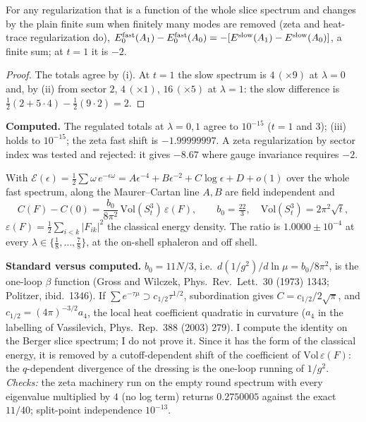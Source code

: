\begin{corollary}\label{p4cor:minus2}
 For any regularization that is a function of the whole slice spectrum and changes by the plain finite sum when finitely many modes are removed (zeta and heat-trace regularization do),
$E_0^{\rm fast}(A_1)-E_0^{\rm fast}(A_0)=-[E^{\rm slow}(A_1)-E^{\rm slow}(A_0)]$, a finite sum; at $t=1$ it is $-2$.
\end{corollary}
\begin{proof}
The totals agree by (i). At $t=1$ the slow spectrum is $4\,(\times9)$ at $\lambda=0$ and, by (ii) from sector $2$,
$4\,(\times1)$, $16\,(\times5)$ at $\lambda=1$: the slow difference is $\tfrac12(2+5\cdot4)-\tfrac12(9\cdot2)=2$.
\end{proof}
\noindent\textbf{Computed.} The regulated totals at $\lambda=0,1$ agree to $10^{-15}$ ($t=1$ and $3$); (iii) holds to
$10^{-15}$; the zeta fast shift is $-1.99999997$. A zeta regularization
by sector index was tested and rejected: it gives $-8.67$ where gauge invariance requires $-2$.

\begin{theorem}\label{p4thm:uv}
 With $\mathcal{E}(\epsilon)=\tfrac12\sum\omega\,e^{-\epsilon\omega}=A\epsilon^{-4}+B\epsilon^{-2}+C\log\epsilon+D+o(1)$
over the whole fast spectrum, along the Maurer--Cartan line $A,B$ are field independent and
\[
 C(F)-C(0)=\frac{b_0}{8\pi^2}\,\mathrm{Vol}(S^3_t)\,\varepsilon(F),\qquad b_0=\tfrac{22}{3},\quad\mathrm{Vol}(S^3_t)=2\pi^2\sqrt t,
\]
$\varepsilon(F)=\tfrac12\sum_{i<k}|F_{ik}|^2$ the classical energy density. The ratio is $1.0000\pm10^{-4}$ at every
$\lambda\in\{\tfrac18,\dots,\tfrac78\}$, at the on-shell sphaleron and off shell.
\end{theorem}
\noindent\textbf{Standard versus computed.} $b_0=11N/3$, i.e.\ $d(1/g^2)/d\ln\mu=b_0/8\pi^2$, is the one-loop $\beta$ function
(Gross and Wilczek, Phys.\ Rev.\ Lett.\ 30 (1973) 1343; Politzer, ibid.\ 1346). If $\sum e^{-\tau\mu}\supset c_{1/2}\tau^{1/2}$,
subordination gives $C=c_{1/2}/2\sqrt\pi$, and $c_{1/2}=(4\pi)^{-3/2}a_4$, the local heat coefficient quadratic in curvature ($a_4$ in the labelling of
Vassilevich, Phys.\ Rep.\ 388 (2003) 279). I compute the identity on the Berger slice spectrum; I do not prove it. Since it
has the form of the classical energy, it is removed by a cutoff-dependent shift of the coefficient of $\mathrm{Vol}\,\varepsilon(F)$:
the $q$-dependent divergence of the dressing is the one-loop running of $1/g^2$. \emph{Checks:} the zeta machinery run on the empty round spectrum with every eigenvalue multiplied by $4$ (no log term)
returns $0.2750005$ against the exact $11/40$; split-point independence $10^{-13}$.

